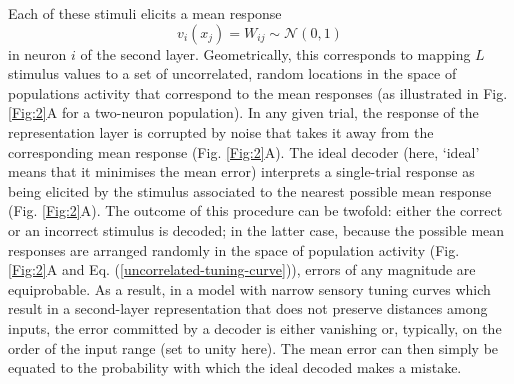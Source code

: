 \documentclass[a4paper]{article}%
\begin{document}
Each of these stimuli elicits a mean response
\begin{equation}
v_{i}(x_{j})=W_{ij}\sim\mathcal{N}(0,1)
\label{uncorrelated-tuning-curve}
\end{equation}
in neuron $i$ of the second layer. Geometrically, this corresponds to mapping
$L$ stimulus values to a set of uncorrelated, random locations in the space of
populations activity that correspond to the mean responses (as illustrated in
Fig. \ref{Fig:2}A for a two-neuron population). In any given trial, the
response of the representation layer is corrupted by noise that takes it away
from the corresponding mean response (Fig. \ref{Fig:2}A). The ideal decoder
(here, `ideal' means that it minimises the mean error) interprets a
single-trial response as being elicited by the stimulus associated to the
nearest possible mean response (Fig. \ref{Fig:2}A). The outcome of this
procedure can be twofold: either the correct or an incorrect stimulus is
decoded; in the latter case, because the possible mean responses are arranged
randomly in the space of population activity (Fig. \ref{Fig:2}A and Eq.
(\ref{uncorrelated-tuning-curve})), errors of any magnitude are equiprobable.
As a result, in a model with narrow sensory tuning curves which result in a
second-layer representation that does not preserve distances among inputs, the
error committed by a decoder is either vanishing or, typically, on the order
of the input range (set to unity here). The mean error can then simply be
equated to the probability with which the ideal decoded makes a mistake.
\end{document}
